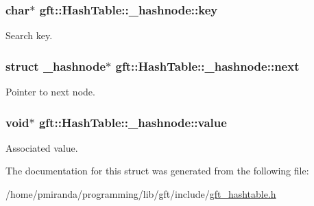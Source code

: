 \subsubsection[{\texorpdfstring{key}{key}}]{\setlength{\rightskip}{0pt plus 5cm}char$\ast$ gft\+::\+Hash\+Table\+::\+\_\+hashnode\+::key}\hypertarget{structgft_1_1HashTable_1_1__hashnode_a6eb232e6a3259f802947f1968288e319}{}\label{structgft_1_1HashTable_1_1__hashnode_a6eb232e6a3259f802947f1968288e319}


Search key. 

\subsubsection[{\texorpdfstring{next}{next}}]{\setlength{\rightskip}{0pt plus 5cm}struct {\bf \+\_\+hashnode}$\ast$ gft\+::\+Hash\+Table\+::\+\_\+hashnode\+::next}\hypertarget{structgft_1_1HashTable_1_1__hashnode_ab30373c898ea03781984ea757fa439f5}{}\label{structgft_1_1HashTable_1_1__hashnode_ab30373c898ea03781984ea757fa439f5}


Pointer to next node. 

\subsubsection[{\texorpdfstring{value}{value}}]{\setlength{\rightskip}{0pt plus 5cm}void$\ast$ gft\+::\+Hash\+Table\+::\+\_\+hashnode\+::value}\hypertarget{structgft_1_1HashTable_1_1__hashnode_a2e02f3fdfd0d509ca0ec8dbdd57e19de}{}\label{structgft_1_1HashTable_1_1__hashnode_a2e02f3fdfd0d509ca0ec8dbdd57e19de}


Associated value. 



The documentation for this struct was generated from the following file\+:\begin{DoxyCompactItemize}
\item 
/home/pmiranda/programming/lib/gft/include/\hyperlink{gft__hashtable_8h}{gft\+\_\+hashtable.\+h}\end{DoxyCompactItemize}
